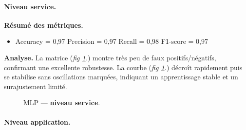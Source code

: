 \documentclass[conference]{IEEEtran}
\begin{document}
\paragraph{Niveau service.}

\textbf{Résumé des métriques.}
\begin{itemize}
    \item Accuracy = 0{,}97 \quad
          Precision = 0{,}97 \quad
          Recall = 0{,}98 \quad
          F1-score = 0{,}97
\end{itemize}

\textbf{Analyse.}
La matrice (\textit{fig \ref{fig:mlp-service}.}) montre très peu de faux positifs/négatifs, confirmant une excellente robustesse. 
La courbe (\textit{fig \ref{fig:mlp-service}.}) décroît rapidement puis se stabilise sans oscillations marquées, indiquant un apprentissage stable et un surajustement limité.

\begin{figure}[!t]
  \centering
  \hfill%
  \caption{MLP — \textbf{niveau service}.}
  \label{fig:mlp-service}
\end{figure}

\FloatBarrier
\paragraph{Niveau application.}
\end{document}
